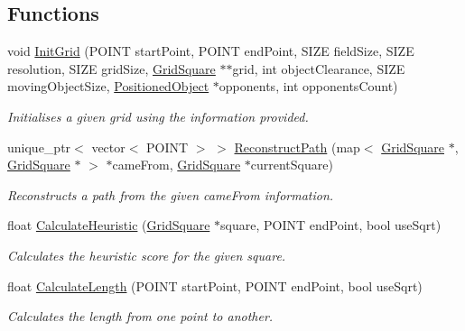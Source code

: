\subsection*{Functions}
\begin{DoxyCompactItemize}
\item 
void \hyperlink{namespace_native_route_finders_ab267d2ce38d5024e816f6379585f1e0f}{Init\-Grid} (P\-O\-I\-N\-T start\-Point, P\-O\-I\-N\-T end\-Point, S\-I\-Z\-E field\-Size, S\-I\-Z\-E resolution, S\-I\-Z\-E grid\-Size, \hyperlink{class_native_route_finders_1_1_grid_square}{Grid\-Square} $\ast$$\ast$grid, int object\-Clearance, S\-I\-Z\-E moving\-Object\-Size, \hyperlink{struct_native_route_finders_1_1_positioned_object}{Positioned\-Object} $\ast$opponents, int opponents\-Count)
\begin{DoxyCompactList}\small\item\em Initialises a given grid using the information provided. \end{DoxyCompactList}\item 
unique\-\_\-ptr$<$ vector$<$ P\-O\-I\-N\-T $>$ $>$ \hyperlink{namespace_native_route_finders_ad3a66e5b5e93bcbd27124b564d167bde}{Reconstruct\-Path} (map$<$ \hyperlink{class_native_route_finders_1_1_grid_square}{Grid\-Square} $\ast$, \hyperlink{class_native_route_finders_1_1_grid_square}{Grid\-Square} $\ast$ $>$ $\ast$came\-From, \hyperlink{class_native_route_finders_1_1_grid_square}{Grid\-Square} $\ast$current\-Square)
\begin{DoxyCompactList}\small\item\em Reconstructs a path from the given came\-From information. \end{DoxyCompactList}\item 
float \hyperlink{namespace_native_route_finders_a19bff4002ea9240e17f01f3a9a28e812}{Calculate\-Heuristic} (\hyperlink{class_native_route_finders_1_1_grid_square}{Grid\-Square} $\ast$square, P\-O\-I\-N\-T end\-Point, bool use\-Sqrt)
\begin{DoxyCompactList}\small\item\em Calculates the heuristic score for the given square. \end{DoxyCompactList}\item 
float \hyperlink{namespace_native_route_finders_a1c7be883799b933a15a6b6efce02e950}{Calculate\-Length} (P\-O\-I\-N\-T start\-Point, P\-O\-I\-N\-T end\-Point, bool use\-Sqrt)
\begin{DoxyCompactList}\small\item\em Calculates the length from one point to another. \end{DoxyCompactList}\item 
$$
\end{DoxyCompactItemize}
